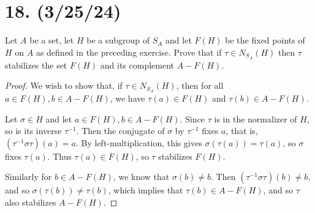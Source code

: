 \documentclass{article}
\begin{document}
\section*{18. (3/25/24)}

Let $A$ be a set, let $H$ be a subgroup of $S_A$ and let $F(H)$ be the fixed points of $H$ on $A$ as defined in the preceding exercise. Prove that if $\tau \in N_{S_A}(H)$ then $\tau$ stabilizes the set $F(H)$ and its complement $A - F(H)$.

\begin{proof}
    We wish to show that, if $\tau \in N_{S_A}(H)$, then for all $a \in F(H), b \in A - F(H)$, we have $\tau(a) \in F(H)$ and $\tau(b) \in A - F(H)$.

    Let $\sigma \in H$ and let $a \in F(H), b \in A - F(H)$. Since $\tau$ is in the normalizer of $H$, so is its inverse $\tau^{-1}$. Then the conjugate of $\sigma$ by $\tau^{-1}$ fixes $a$, that is, $(\tau^{-1} \sigma \tau)(a) = a$. By left-multiplication, this gives $\sigma(\tau(a)) = \tau(a)$, so $\sigma$ fixes $\tau(a)$. Thus $\tau(a) \in F(H)$, so $\tau$ stabilizes $F(H)$.

    Similarly for $b \in A - F(H)$, we know that $\sigma(b) \neq b$. Then $(\tau^{-1} \sigma \tau)(b) \neq b$, and so $\sigma(\tau(b)) \neq \tau(b)$, which implies that $\tau(b) \in A - F(H)$, and so $\tau$ also stabilizes $A - F(H)$.
\end{proof}
\end{document}
